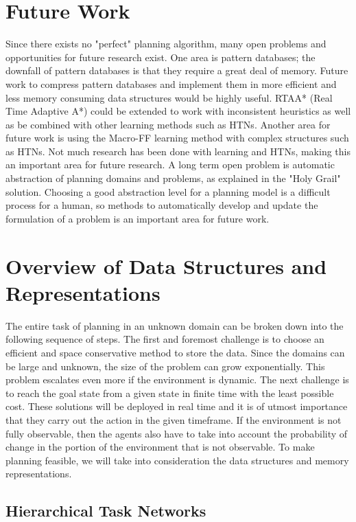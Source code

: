 \documentclass[tog]{acmsiggraph}
\begin{document}
\section{Future Work}
\indent Since there exists no "perfect" planning algorithm, many open problems and opportunities for future research exist. One area is pattern databases; the downfall of pattern databases is that they require a great deal of memory. Future work to compress pattern databases and implement them in more efficient and less memory consuming data structures would be highly useful. RTAA* (Real Time Adaptive A*) could be extended to work with inconsistent heuristics as well as be combined with other learning methods such as HTNs. Another area for future work is using the Macro-FF learning method with complex structures such as HTNs. Not much research has been done with learning and HTNs, making this an important area for future research. A long term open problem is automatic abstraction of planning domains and problems, as explained in the "Holy Grail" solution. Choosing a good abstraction level for a planning model is a difficult process for a human, so methods to automatically develop and update the formulation of a problem is an important area for future work.

\section{Overview of Data Structures and Representations}
The entire task of planning in an unknown domain can be broken down
into the following sequence of steps. The first and foremost challenge
is to choose an efficient and space conservative method to store the
data. Since the domains can be large and unknown, the size of the
problem can grow exponentially. This problem escalates even more if
the environment is dynamic. The next challenge is to reach the goal
state from a given state in finite time with the least possible cost.
These solutions will be deployed in real time and it is of utmost
importance that they carry out the action in the given timeframe. If
the environment is not fully observable, then
the agents also have to take into account the probability of change in
the portion of the environment that is not observable. To make
planning feasible, we will take into consideration the data
structures and memory representations.

\subsection{Hierarchical Task Networks}
\end{document}
